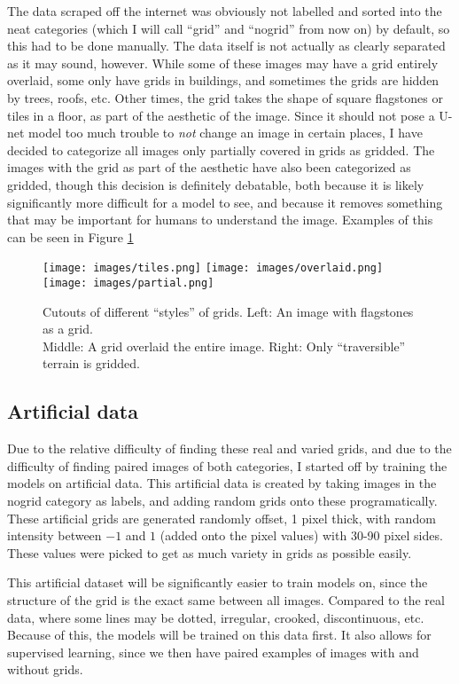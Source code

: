 The data scraped off the internet was obviously not labelled and sorted into the neat categories (which I will call ``grid'' and ``nogrid'' from now on) by default, so this had to be done manually. The data itself is not actually as clearly separated as it may sound, however. While some of these images may have a grid entirely overlaid, some only have grids in buildings, and sometimes the grids are hidden by trees, roofs, etc. Other times, the grid takes the shape of square flagstones or tiles in a floor, as part of the aesthetic of the image. Since it should not pose a U-net model too much trouble to \textit{not} change an image in certain places, I have decided to categorize all images only partially covered in grids as gridded. The images with the grid as part of the aesthetic have also been categorized as gridded, though this decision is definitely debatable, both because it is likely significantly more difficult for a model to see, and because it removes something that may be important for humans to understand the image. Examples of this can be seen in Figure \ref{image:example}
\begin{figure}[H]
  \centering
  \captionsetup{justification=centering}
  \texttt{[image: images/tiles.png]}
  \texttt{[image: images/overlaid.png]}
  \texttt{[image: images/partial.png]}
  \caption[center]{Cutouts of different ``styles'' of grids. Left: An image with flagstones as a grid. \\Middle: A grid overlaid the entire image. Right: Only ``traversible'' terrain is gridded.}\label{image:example}
\end{figure}

\subsection{Artificial data}
Due to the relative difficulty of finding these real and varied grids, and due to the difficulty of finding paired images of both categories, I started off by training the models on artificial data. This artificial data is created by taking images in the nogrid category as labels, and adding random grids onto these programatically. These artificial grids are generated randomly offset, 1 pixel thick, with random intensity between $-1$ and $1$ (added onto the pixel values) with 30-90 pixel sides. These values were picked to get as much variety in grids as possible easily.

This artificial dataset will be significantly easier to train models on, since the structure of the grid is the exact same between all images. Compared to the real data, where some lines may be dotted, irregular, crooked, discontinuous, etc. Because of this, the models will be trained on this data first. It also allows for supervised learning, since we then have paired examples of images with and without grids.
